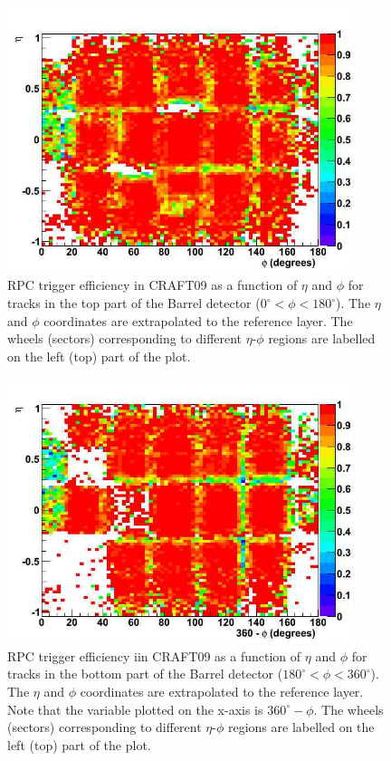 \begin{figure}[hbtp]
  \begin{center} 
     \includegraphics[width=0.9\textwidth]{eff_eta_phi_top_09}
       \caption{RPC trigger efficiency in CRAFT09 as a function 
       of $\eta$ and $\phi$ for tracks in the top part of the Barrel detector
      ($ 0^\circ < \phi < 180^\circ $). The $\eta$ and $\phi$
      coordinates are extrapolated to the reference layer.
      The wheels (sectors) corresponding to different $\eta$-$\phi$
      regions are labelled on the left (top) part of the plot.
}
    \label{fig:eff_eta_phi_top_09}
  \end{center}
\end{figure}


\begin{figure}[hbtp]
     \begin{center}
      \includegraphics[width=0.9\textwidth]{eff_eta_phi_bot_09}
       \caption{RPC trigger efficiency iin CRAFT09 as a function of $\eta$ and $\phi$
       for tracks in the bottom part of the Barrel detector
       ($ 180^\circ < \phi < 360^\circ $). The $\eta$ and $\phi$ coordinates are
       extrapolated to the reference layer.
       Note that the variable plotted on the x-axis is
       $360^\circ - \phi$. The wheels (sectors) corresponding to different $\eta$-$\phi$
       regions are labelled on the left (top) part of the plot.
       }
    \label{fig:eff_eta_phi_bot_09}
  \end{center}
\end{figure}

